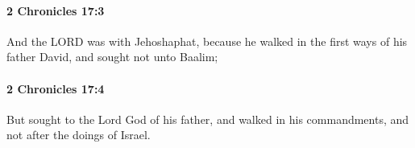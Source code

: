 		\paragraph{2 Chronicles 17:3} %
			\label{2CHRONICLES-17-3}

			And the LORD was with Jehoshaphat, because he walked in the first ways of his father David, and sought not unto Baalim;


		\paragraph{2 Chronicles 17:4} %
			\label{2CHRONICLES-17-4}

			But sought to the Lord God of his father, and walked in his commandments, and not after the doings of Israel.


